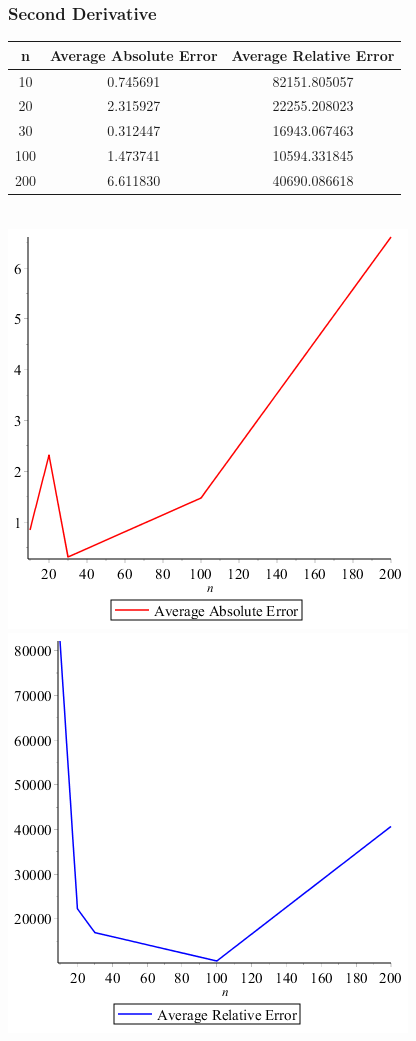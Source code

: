 \documentclass[11pt]{article} %
\begin{document}
\subsubsection*{Second Derivative}
\begin{tabular}{c | c | c }
n & Average Absolute Error & Average Relative Error \\
\hline
10 & 0.745691 & 82151.805057 \\
20 & 2.315927& 22255.208023\\
30 & 0.312447& 16943.067463\\
100 & 1.473741 & 10594.331845 \\
200 & 6.611830 & 40690.086618 \\
\end{tabular}\\
\includegraphics[scale=.5]{plots/problem2secondderivplot1.png}
\includegraphics[scale=.5]{plots/problem2secondderivplot2.png}
\end{document}
